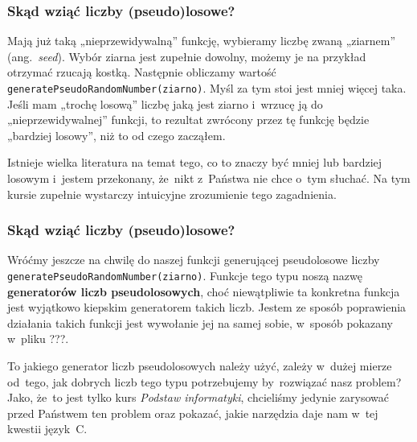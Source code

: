 \documentclass[10pt,t]{beamer}
\begin{document}
\begin{frame}
  \frametitle{Skąd wziąć liczby (pseudo)losowe?}


  Mają już taką „nieprzewidywalną” funkcję, wybieramy liczbę zwaną
  „ziarnem” (ang.~\textit{seed}). Wybór ziarna jest zupełnie dowolny,
  możemy je na przykład otrzymać rzucają kostką. Następnie obliczamy
  wartość \texttt{generatePseudoRandomNumber(ziarno)}. Myśl za tym stoi
  jest mniej więcej taka. Jeśli mam „trochę losową” liczbę jaką jest ziarno
  i~wrzucę ją do „nieprzewidywalnej” funkcji, to rezultat zwrócony przez tę
  funkcję będzie „bardziej losowy”, niż to od czego zacząłem.

  Istnieje wielka literatura na temat tego, co to znaczy być mniej lub
  bardziej losowym i~jestem przekonany, że~nikt z~Państwa nie chce o~tym
  słuchać. Na tym kursie zupełnie wystarczy intuicyjne zrozumienie tego
  zagadnienia.

\end{frame}





\begin{frame}
  \frametitle{Skąd wziąć liczby (pseudo)losowe?}


  Wróćmy jeszcze na chwilę do naszej funkcji generującej pseudolosowe liczby
  \texttt{generatePseudoRandomNumber(ziarno)}. Funkcje tego typu
  noszą nazwę \textbf{generatorów liczb pseudolosowych}, choć niewątpliwie
  ta konkretna funkcja jest wyjątkowo kiepskim generatorem takich liczb.
  Jestem ze sposób poprawienia działania takich funkcji jest wywołanie
  jej na samej sobie, w~sposób pokazany w~pliku ???.

  To jakiego generator liczb pseudolosowych należy użyć, zależy w~dużej
  mierze od~tego, jak dobrych liczb tego typu potrzebujemy by~rozwiązać
  nasz problem? Jako, że~to jest tylko kurs \textit{Podstaw informatyki},
  chcieliśmy jedynie zarysować przed Państwem ten problem oraz pokazać,
  jakie narzędzia daje nam w~tej kwestii język~C.

\end{frame}




































\printbibliography





\end{document}
